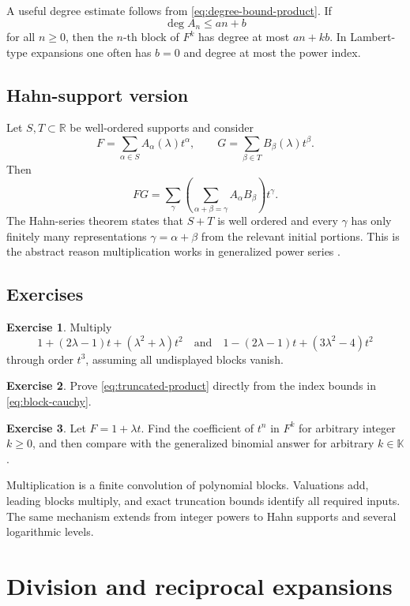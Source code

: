 \documentclass[11pt,openany]{book}
\theoremstyle{definition}
\newtheorem{exercise}{Exercise}[chapter]
\theoremstyle{plain}
\theoremstyle{remark}
\newcommand{\R}{\mathbb{R}}
\newcommand{\K}{\mathbb{K}}
\DeclareMathOperator{\polydeg}{deg}
\begin{document}
A useful degree estimate follows from \cref{eq:degree-bound-product}. If
\[
 \polydeg A_n\le an+b
\]
for all \(n\ge0\), then the \(n\)-th block of \(F^k\) has degree at most \(an+kb\). In Lambert-type expansions one often has \(b=0\) and degree at most the power index.

\section{Hahn-support version}
Let \(S,T\subset\R\) be well-ordered supports and consider
\[
 F=\sum_{\alpha\in S}A_\alpha(\lambda)t^\alpha,
 \qquad
 G=\sum_{\beta\in T}B_\beta(\lambda)t^\beta.
\]
Then
\[
 FG=\sum_\gamma
 \left(\sum_{\alpha+\beta=\gamma}A_\alpha B_\beta\right)t^\gamma.
\]
The Hahn-series theorem states that \(S+T\) is well ordered and every \(\gamma\) has only finitely many representations \(\gamma=\alpha+\beta\) from the relevant initial portions. This is the abstract reason multiplication works in generalized power series \cite{hahn,vdhoeven-book}.

\section{Exercises}
\begin{exercise}
Multiply
\[
 1+(2\lambda-1)t+(\lambda^2+\lambda)t^2
\quad\text{and}\quad
 1-(2\lambda-1)t+(3\lambda^2-4)t^2
\]
through order \(t^3\), assuming all undisplayed blocks vanish.
\end{exercise}
\begin{exercise}
Prove \cref{eq:truncated-product} directly from the index bounds in \cref{eq:block-cauchy}.
\end{exercise}
\begin{exercise}
Let \(F=1+\lambda t\). Find the coefficient of \(t^n\) in \(F^k\) for arbitrary integer \(k\ge0\), and then compare with the generalized binomial answer for arbitrary \(k\in\K\).
\end{exercise}

\begin{summarybox}
Multiplication is a finite convolution of polynomial blocks. Valuations add, leading blocks multiply, and exact truncation bounds identify all required inputs. The same mechanism extends from integer powers to Hahn supports and several logarithmic levels.
\end{summarybox}

\chapter{Division and reciprocal expansions}\label{ch:division}
\end{document}
